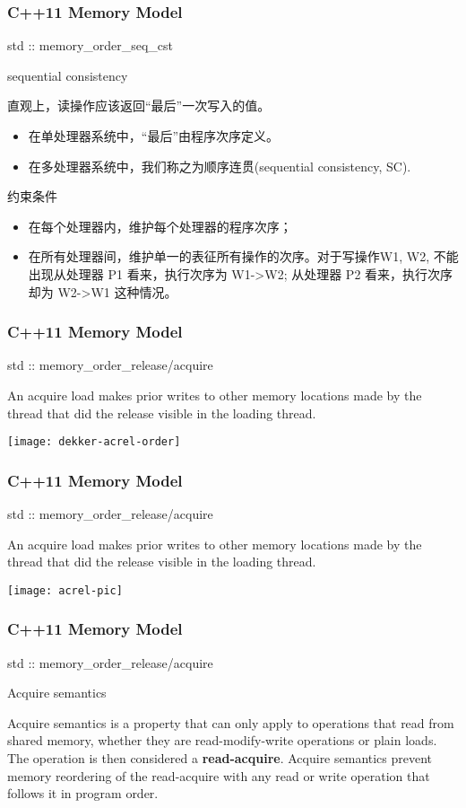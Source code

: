 \begin{frame}
    \frametitle{C++11 Memory Model}
    \LARGE
    std :: memory\_order\_seq\_cst
    
    
    sequential consistency
    
    \normalsize
    直观上，读操作应该返回“最后”一次写入的值。
    \begin{itemize}
        \item 在单处理器系统中，“最后”由程序次序定义。
        \item 在多处理器系统中，我们称之为顺序连贯(sequential consistency, SC).
    \end{itemize}
    约束条件
    \begin{itemize}
        \item 在每个处理器内，维护每个处理器的程序次序；
        \item 在所有处理器间，维护单一的表征所有操作的次序。对于写操作W1, W2, 不能出现从处理器 P1 看来，执行次序为 W1->W2; 从处理器 P2 看来，执行次序却为 W2->W1 这种情况。 
    \end{itemize}
    
\end{frame}

\begin{frame}
    \frametitle{C++11 Memory Model}
    \LARGE
    std :: memory\_order\_release/acquire
    
    \normalsize
    An acquire load makes prior writes to other memory locations
    made by the thread that did the release visible in the loading
    thread.
    
    
    \texttt{[image: dekker-acrel-order]}
\end{frame}

\begin{frame}
    \frametitle{C++11 Memory Model}
    \LARGE
    std :: memory\_order\_release/acquire
    
    \normalsize
    An acquire load makes prior writes to other memory locations
    made by the thread that did the release visible in the loading
    thread.
    
    
    \texttt{[image: acrel-pic]}
\end{frame}

\begin{frame}
    \frametitle{C++11 Memory Model}
    \LARGE
    std :: memory\_order\_release/acquire
    
    \large
\begin{block}{Acquire semantics}
    
Acquire semantics is a property that can only apply to operations that read from shared memory, whether they are read-modify-write operations or plain loads. The operation is then considered a \textbf{read-acquire}. Acquire semantics prevent memory reordering of the read-acquire with any read or write operation that follows it in program order.
\end{block}
    \end{frame}

